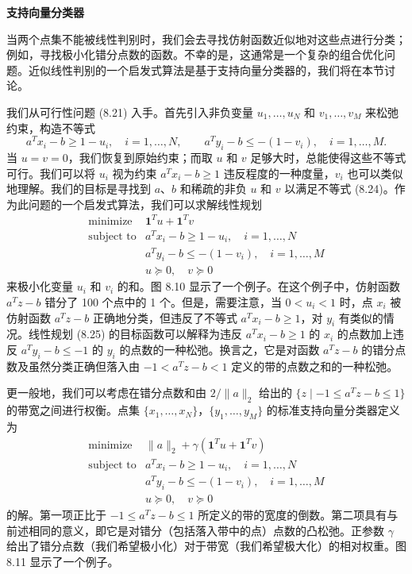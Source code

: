 \documentclass[UTF8, 12pt, fontset=fandol, oneside]{ctexart}
\begin{document}
\noindent\textbf{支持向量分类器}

当两个点集不能被线性判别时，我们会去寻找仿射函数近似地对这些点进行分类；例如，寻找极小化错分点数的函数。不幸的是，这通常是一个复杂的组合优化问题。近似线性判别的一个启发式算法是基于支持向量分类器的，我们将在本节讨论。

我们从可行性问题 (8.21) 入手。首先引入非负变量 $u_1,\ldots,u_N$ 和 $v_1,\ldots,v_M$ 来松弛约束，构造不等式
\[
a^Tx_i-b\geq 1-u_i,\quad i=1,\ldots,N,\qquad
a^Ty_i-b\leq -(1-v_i),\quad i=1,\ldots,M.
\tag{8.24}
\]
当 $u=v=0$，我们恢复到原始约束；而取 $u$ 和 $v$ 足够大时，总能使得这些不等式可行。我们可以将 $u_i$ 视为约束 $a^Tx_i-b\geq 1$ 违反程度的一种度量，$v_i$ 也可以类似地理解。我们的目标是寻找到 $a$、$b$ 和稀疏的非负 $u$ 和 $v$ 以满足不等式 (8.24)。作为此问题的一个启发式算法，我们可以求解线性规划
\[
\begin{array}{ll}
\mbox{minimize} & \mathbf{1}^Tu+\mathbf{1}^Tv\\
\mbox{subject to} & a^Tx_i-b\geq 1-u_i,\quad i=1,\ldots,N\\
& a^Ty_i-b\leq -(1-v_i),\quad i=1,\ldots,M\\
& u\succeq 0,\quad v\succeq 0
\end{array}
\tag{8.25}
\]
来极小化变量 $u_i$ 和 $v_i$ 的和。图 8.10 显示了一个例子。在这个例子中，仿射函数 $a^Tz-b$ 错分了 100 个点中的 1 个。但是，需要注意，当 $0<u_i<1$ 时，点 $x_i$ 被仿射函数
$a^Tz-b$ 正确地分类，但违反了不等式 $a^Tx_i-b\geq 1$，对 $y_i$ 有类似的情况。线性规划 (8.25) 的目标函数可以解释为违反 $a^Tx_i-b\geq 1$ 的 $x_i$ 的点数加上违反 $a^Ty_i-b\leq -1$ 的 $y_i$ 的点数的一种松弛。换言之，它是对函数 $a^Tz-b$ 的错分点数及虽然分类正确但落入由 $-1<a^Tz-b<1$ 定义的带的点数之和的一种松弛。

更一般地，我们可以考虑在错分点数和由 $2/\|a\|_2$ 给出的 $\{z\mid -1\leq a^Tz-b\leq 1\}$ 的带宽之间进行权衡。点集 $\{x_1,\ldots,x_N\}$，$\{y_1,\ldots,y_M\}$ 的标准支持向量分类器定义为
\[
\begin{array}{ll}
\mbox{minimize} & \|a\|_2+\gamma(\mathbf{1}^Tu+\mathbf{1}^Tv)\\
\mbox{subject to} & a^Tx_i-b\geq 1-u_i,\quad i=1,\ldots,N\\
& a^Ty_i-b\leq -(1-v_i),\quad i=1,\ldots,M\\
& u\succeq 0,\quad v\succeq 0
\end{array}
\]
的解。第一项正比于 $-1\leq a^Tz-b\leq 1$ 所定义的带的宽度的倒数。第二项具有与前述相同的意义，即它是对错分（包括落入带中的点）点数的凸松弛。正参数 $\gamma$ 给出了错分点数（我们希望极小化）对于带宽（我们希望极大化）的相对权重。图 8.11 显示了一个例子。
\end{document}

